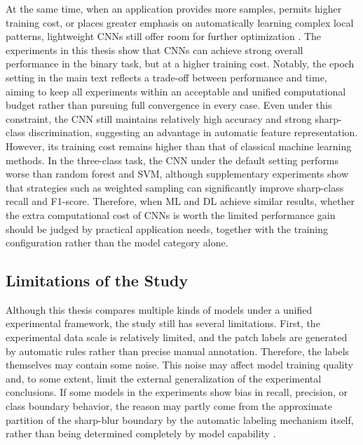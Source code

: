 \par At the same time, when an application provides more samples, permits higher
training cost, or places greater emphasis on automatically learning complex
local patterns, lightweight CNNs still offer room for further optimization
\cite{lecun2002gradient,krizhevsky2012imagenet,goodfellow2016deep,shorten2019survey}. The
experiments in this thesis show that CNNs can achieve strong overall performance
in the binary task, but at a higher training cost. Notably, the epoch setting in
the main text reflects a trade-off between performance and time, aiming to keep
all experiments within an acceptable and unified computational budget rather
than pursuing full convergence in every case. Even under this constraint, the
CNN still maintains relatively high accuracy and strong sharp-class
discrimination, suggesting an advantage in automatic feature representation.
However, its training cost remains higher than that of classical machine
learning methods. In the three-class task, the CNN under the default setting
performs worse than random forest and SVM, although supplementary experiments
show that strategies such as weighted sampling can significantly improve
sharp-class recall and F1-score. Therefore, when ML and DL achieve similar
results, whether the extra computational cost of CNNs is worth the limited
performance gain should be judged by practical application needs, together with
the training configuration rather than the model category alone.

\subsection{Limitations of the Study}
\par Although this thesis compares multiple kinds of models under a unified
experimental framework, the study still has several limitations. First, the
experimental data scale is relatively limited, and the patch labels are
generated by automatic rules rather than precise manual annotation. Therefore,
the labels themselves may contain some noise. This noise may affect model
training quality and, to some extent, limit the external generalization of the
experimental conclusions. If some models in the experiments show bias in recall,
precision, or class boundary behavior, the reason may partly come from the
approximate partition of the sharp-blur boundary by the automatic labeling
mechanism itself, rather than being determined completely by model capability
\cite{5739529,pertuz2013analysis,lee2013pseudo}.

